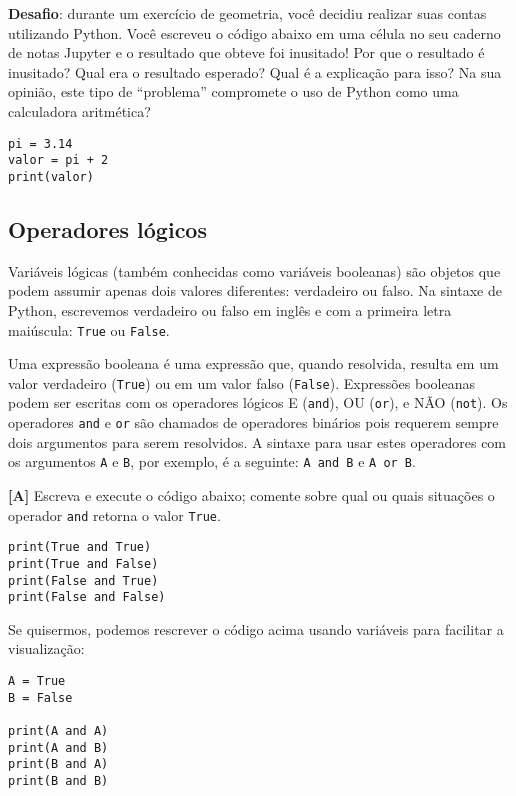 \documentclass[11pt]{article}
\begin{document}
\textbf{Desafio}: durante um exercício de geometria, você decidiu realizar suas contas utilizando Python. Você escreveu o código abaixo em uma célula no seu caderno de notas Jupyter e o resultado que obteve foi inusitado! Por que o resultado é inusitado? Qual era o resultado esperado? Qual é a explicação para isso? Na sua opinião, este tipo de ``problema'' compromete o uso de Python como uma calculadora aritmética?

\begin{verbatim}
pi = 3.14
valor = pi + 2
print(valor)
\end{verbatim}

\subsection{Operadores lógicos}
\label{sec:org6641204}

Variáveis lógicas (também conhecidas como variáveis booleanas) são objetos que podem assumir apenas dois valores diferentes: verdadeiro ou falso. Na sintaxe de Python, escrevemos verdadeiro ou falso em inglês e com a primeira letra maiúscula: \texttt{True} ou \texttt{False}.

Uma expressão booleana é uma expressão que, quando resolvida, resulta em um valor verdadeiro (\texttt{True}) ou em um valor falso (\texttt{False}). Expressões booleanas podem ser escritas com os operadores lógicos E (\texttt{and}), OU (\texttt{or}), e NÃO (\texttt{not}). Os operadores \texttt{and} e \texttt{or} são chamados de operadores binários pois requerem sempre dois argumentos para serem resolvidos. A sintaxe para usar estes operadores com os argumentos \texttt{A} e \texttt{B}, por exemplo, é a seguinte: \texttt{A and B} e \texttt{A or B}.

\textbf{[A]} Escreva e execute o código abaixo; comente sobre qual ou quais situações o operador \texttt{and} retorna o valor \texttt{True}.

\begin{verbatim}
print(True and True)
print(True and False)
print(False and True)
print(False and False)
\end{verbatim}

Se quisermos, podemos rescrever o código acima usando variáveis para facilitar a visualização:

\begin{verbatim}
A = True
B = False

print(A and A)
print(A and B)
print(B and A)
print(B and B)
\end{verbatim}
\end{document}
